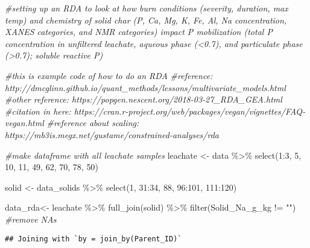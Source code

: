\documentclass[
]{article}
\newenvironment{Shaded}{\begin{snugshade}}{\end{snugshade}}
\newcommand{\CommentTok}[1]{\textcolor[rgb]{0.56,0.35,0.01}{\textit{#1}}}
\newcommand{\DecValTok}[1]{\textcolor[rgb]{0.00,0.00,0.81}{#1}}
\newcommand{\FunctionTok}[1]{\textcolor[rgb]{0.00,0.00,0.00}{#1}}
\newcommand{\NormalTok}[1]{#1}
\newcommand{\OtherTok}[1]{\textcolor[rgb]{0.56,0.35,0.01}{#1}}
\newcommand{\SpecialCharTok}[1]{\textcolor[rgb]{0.00,0.00,0.00}{#1}}
\newcommand{\StringTok}[1]{\textcolor[rgb]{0.31,0.60,0.02}{#1}}
\begin{document}
\begin{Shaded}
\begin{Highlighting}[]
\CommentTok{\#setting up an RDA to look at how burn conditions (severity, duration, max temp) and chemistry of solid char (P, Ca, Mg, K, Fe, Al, Na concentration, XANES categories, and NMR categories) impact P mobilization (total P concentration in unfiltered leachate, aqueous phase (\textless{}0.7), and particulate phase (\textgreater{}0.7); soluble reactive P)}


\CommentTok{\#this is example code of how to do an RDA}
\CommentTok{\#reference: http://dmcglinn.github.io/quant\_methods/lessons/multivariate\_models.html}
\CommentTok{\#other reference: https://popgen.nescent.org/2018{-}03{-}27\_RDA\_GEA.html}
\CommentTok{\#citation in here: https://cran.r{-}project.org/web/packages/vegan/vignettes/FAQ{-}vegan.html}
\CommentTok{\#reference about scaling: https://mb3is.megx.net/gustame/constrained{-}analyses/rda}

\CommentTok{\#make dataframe with all leachate samples}
\NormalTok{leachate }\OtherTok{\textless{}{-}}\NormalTok{ data }\SpecialCharTok{\%\textgreater{}\%}
  \FunctionTok{select}\NormalTok{(}\DecValTok{1}\SpecialCharTok{:}\DecValTok{3}\NormalTok{, }\DecValTok{5}\NormalTok{, }\DecValTok{10}\NormalTok{, }\DecValTok{11}\NormalTok{, }\DecValTok{49}\NormalTok{, }\DecValTok{62}\NormalTok{, }\DecValTok{70}\NormalTok{, }\DecValTok{78}\NormalTok{, }\DecValTok{50}\NormalTok{)}

\NormalTok{solid }\OtherTok{\textless{}{-}}\NormalTok{ data\_solids }\SpecialCharTok{\%\textgreater{}\%}
  \FunctionTok{select}\NormalTok{(}\DecValTok{1}\NormalTok{, }\DecValTok{31}\SpecialCharTok{:}\DecValTok{34}\NormalTok{, }\DecValTok{88}\NormalTok{, }\DecValTok{96}\SpecialCharTok{:}\DecValTok{101}\NormalTok{, }\DecValTok{111}\SpecialCharTok{:}\DecValTok{120}\NormalTok{)}

\NormalTok{data\_rda}\OtherTok{\textless{}{-}}\NormalTok{ leachate }\SpecialCharTok{\%\textgreater{}\%}
  \FunctionTok{full\_join}\NormalTok{(solid) }\SpecialCharTok{\%\textgreater{}\%}
  \FunctionTok{filter}\NormalTok{(Solid\_Na\_g\_kg }\SpecialCharTok{!=} \StringTok{""}\NormalTok{) }\CommentTok{\#remove NAs}
\end{Highlighting}
\end{Shaded}

\begin{verbatim}
## Joining with `by = join_by(Parent_ID)`
\end{verbatim}
\end{document}
